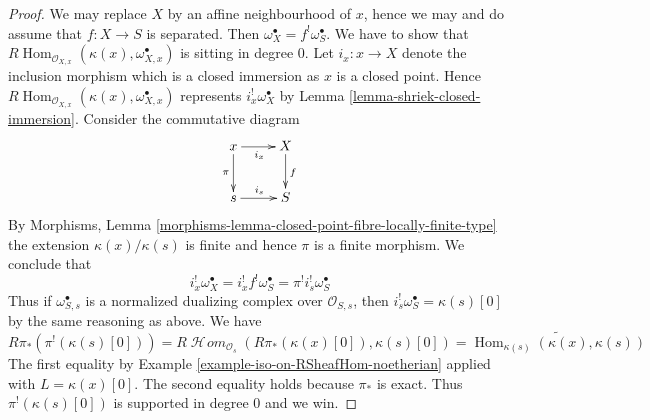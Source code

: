 \documentclass[10pt,a4paper]{amsart}
\theoremstyle{plain}
\theoremstyle{definition}
\theoremstyle{remark}
\numberwithin{equation}{subsection}
\def\Hom{\mathop{\mathrm{Hom}}\nolimits}
\def\SheafHom{\mathop{\mathcal{H}\!\mathit{om}}\nolimits}
\begin{document}
\begin{proof}
We may replace $X$ by an affine neighbourhood of $x$, hence we may
and do assume that $f : X \to S$ is separated.
Then $\omega_X^\bullet = f^!\omega_S^\bullet$. We have to show that
$R\Hom_{\mathcal{O}_{X, x}}(\kappa(x), \omega_{X, x}^\bullet)$
is sitting in degree $0$. Let $i_x : x \to X$ denote the inclusion
morphism which is a closed immersion as $x$ is a closed point.
Hence $R\Hom_{\mathcal{O}_{X, x}}(\kappa(x), \omega_{X, x}^\bullet)$
represents $i_x^!\omega_X^\bullet$ by
Lemma \ref{lemma-shriek-closed-immersion}.
Consider the commutative diagram
$$
\xymatrix{
x \ar[r]_{i_x} \ar[d]_\pi & X \ar[d]^f \\
s \ar[r]^{i_s} & S
}
$$
By Morphisms, Lemma
\ref{morphisms-lemma-closed-point-fibre-locally-finite-type}
the extension $\kappa(x)/\kappa(s)$ is finite and hence
$\pi$ is a finite morphism. We conclude that
$$
i_x^!\omega_X^\bullet = i_x^! f^! \omega_S^\bullet =
\pi^! i_s^! \omega_S^\bullet
$$
Thus if $\omega_{S, s}^\bullet$ is a normalized dualizing complex
over $\mathcal{O}_{S, s}$, then $i_s^!\omega_S^\bullet = \kappa(s)[0]$
by the same reasoning as above. We have
$$
R\pi_*(\pi^!(\kappa(s)[0])) =
R\SheafHom_{\mathcal{O}_s}(R\pi_*(\kappa(x)[0]), \kappa(s)[0]) =
\widetilde{\Hom_{\kappa(s)}(\kappa(x), \kappa(s))}
$$
The first equality by Example \ref{example-iso-on-RSheafHom-noetherian}
applied with $L = \kappa(x)[0]$. The second equality holds because
$\pi_*$ is exact.
Thus $\pi^!(\kappa(s)[0])$ is supported in degree $0$ and we win.
\end{proof}
\end{document}
